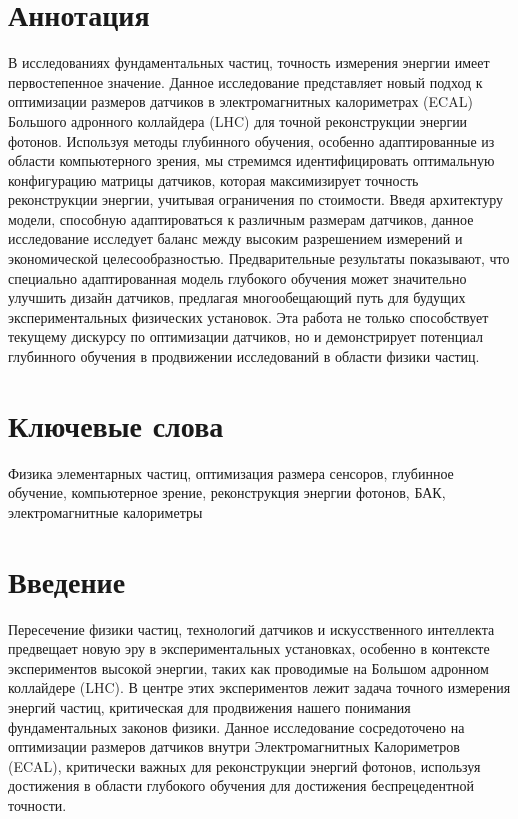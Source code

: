 \documentclass[a4paper,12pt]{extarticle}
\begin{document}
\newpage
\setcounter{page}{2}

{
	\hypersetup{linkcolor=black}
	\tableofcontents
}

\newpage

\newpage
\section*{Аннотация}   %
В исследованиях фундаментальных частиц, точность измерения энергии имеет первостепенное значение. Данное исследование представляет новый подход к оптимизации размеров датчиков в электромагнитных калориметрах (ECAL) Большого адронного коллайдера (LHC) для точной реконструкции энергии фотонов. Используя методы глубинного обучения, особенно адаптированные из области компьютерного зрения, мы стремимся идентифицировать оптимальную конфигурацию матрицы датчиков, которая максимизирует точность реконструкции энергии, учитывая ограничения по стоимости. Введя архитектуру модели, способную адаптироваться к различным размерам датчиков, данное исследование исследует баланс между высоким разрешением измерений и экономической целесообразностью. Предварительные результаты показывают, что специально адаптированная модель глубокого обучения может значительно улучшить дизайн датчиков, предлагая многообещающий путь для будущих экспериментальных физических установок. Эта работа не только способствует текущему дискурсу по оптимизации датчиков, но и демонстрирует потенциал глубинного обучения в продвижении исследований в области физики частиц.


\section*{Ключевые слова}
Физика элементарных частиц, оптимизация размера сенсоров, глубинное обучение, компьютерное зрение, реконструкция энергии фотонов, БАК, электромагнитные калориметры
\pagebreak

\section{Введение}
Пересечение физики частиц, технологий датчиков и искусственного интеллекта предвещает новую эру в экспериментальных установках, особенно в контексте экспериментов высокой энергии, таких как проводимые на Большом адронном коллайдере (LHC). В центре этих экспериментов лежит задача точного измерения энергий частиц, критическая для продвижения нашего понимания фундаментальных законов физики. Данное исследование сосредоточено на оптимизации размеров датчиков внутри Электромагнитных Калориметров (ECAL), критически важных для реконструкции энергий фотонов, используя достижения в области глубокого обучения для достижения беспрецедентной точности.
\end{document}
